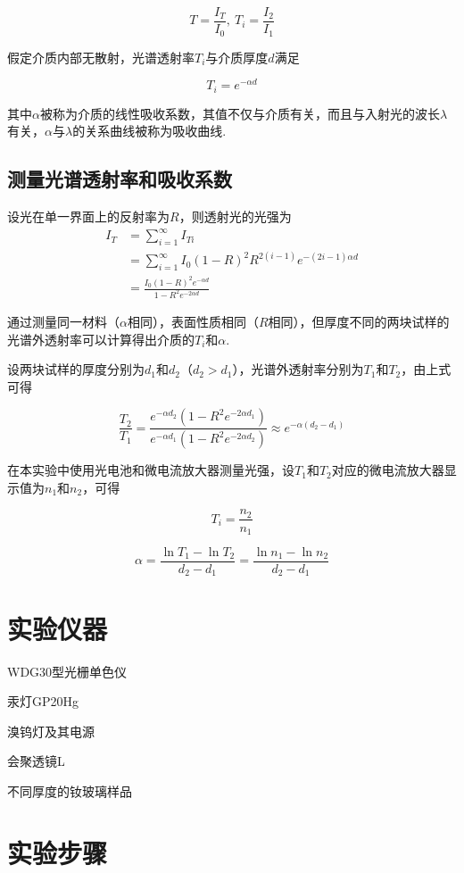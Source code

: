 \documentclass{thureport}
\begin{document}
$$T=\frac{I_T}{I_0},\ T_i=\frac{I_2}{I_1}$$

假定介质内部无散射，光谱透射率$T_i$与介质厚度$d$满足

$$T_i=e^{-\alpha d}$$

其中$\alpha$被称为介质的线性吸收系数，其值不仅与介质有关，而且与入射光的波长$\lambda$有关，$\alpha$与$\lambda$的关系曲线被称为吸收曲线.

\subsection{测量光谱透射率和吸收系数}
设光在单一界面上的反射率为$R$，则透射光的光强为
$$
\begin{aligned}
I_T&=\sum_{i=1}^\infty I_{Ti}\\
&=\sum_{i=1}^\infty I_0(1-R)^2R^{2(i-1)}e^{-(2i-1)\alpha d}\\
&=\frac{I_0(1-R)^2e^{-\alpha d}}{1-R^2e^{-2\alpha d}}
\end{aligned}
$$

通过测量同一材料（$\alpha$相同），表面性质相同（$R$相同），但厚度不同的两块试样的光谱外透射率可以计算得出介质的$T_i$和$\alpha$.

设两块试样的厚度分别为$d_1$和$d_2$（$d_2>d_1$），光谱外透射率分别为$T_1$和$T_2$，由上式可得

$$\frac{T_2}{T_1}=\frac{e^{-\alpha d_2}(1-R^2e^{-2\alpha d_1})}{e^{-\alpha d_1}(1-R^2e^{-2\alpha d_2})}\approx e^{-\alpha(d_2-d_1)}$$

在本实验中使用光电池和微电流放大器测量光强，设$T_1$和$T_2$对应的微电流放大器显示值为$n_1$和$n_2$，可得

$$T_i=\frac{n_2}{n_1}$$

$$\alpha=\frac{\ln{T_1}-\ln{T_2}}{d_2-d_1}=\frac{\ln{n_1}-\ln{n_2}}{d_2-d_1}$$

\section{实验仪器}
\begin{clause}
	\item WDG30型光栅单色仪
	\item 汞灯GP20Hg
	\item 溴钨灯及其电源
	\item 会聚透镜L
	\item 不同厚度的钕玻璃样品
\end{clause}

\section{实验步骤}
\end{document}

